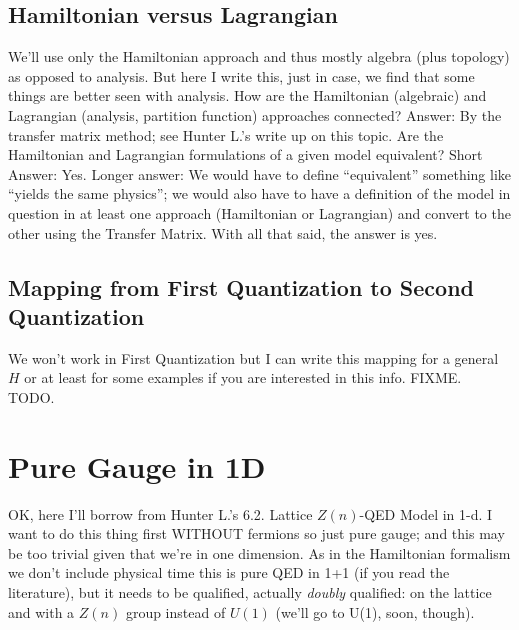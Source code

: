  	 \subsection{Hamiltonian versus Lagrangian}
 	 We'll use only the Hamiltonian approach and thus mostly algebra (plus topology) as opposed to analysis. But here I write this, just in
 	 case, we find that some things are better seen with analysis.
 	 How are the Hamiltonian (algebraic) and Lagrangian (analysis, partition function) approaches connected?
 	 Answer: By the transfer matrix method; see Hunter L.'s write up on this topic.
 	 Are the Hamiltonian and Lagrangian formulations of a given model equivalent?
 	 Short Answer: Yes. Longer answer: We would have to define ``equivalent'' something like ``yields the same physics''; we would also have to have a definition
 	 of the model in question in at least one approach (Hamiltonian or Lagrangian) and convert to the other using the Transfer Matrix.
 	 With all that said, the answer is yes.
 
 	 \subsection{Mapping from First Quantization to Second Quantization}
 	 We won't work in First Quantization but I can write this mapping for a general $H$ or at least for some examples if you are interested in this info.
 	 FIXME. TODO.
 
	\section{Pure Gauge in 1D}
    OK, here I'll borrow from Hunter L.'s 6.2. Lattice $Z(n)$-QED Model in 1-d.
	I want to do this thing first WITHOUT fermions so just pure gauge; and this may be too trivial given that we're in one dimension.
	As in the Hamiltonian formalism we don't include physical time this is pure QED in 1+1 (if you read the literature), but it needs
	to be qualified, actually \emph{doubly} qualified: on the lattice and with a $Z(n)$ group instead of $U(1)$ (we'll go to U(1), soon, though).

